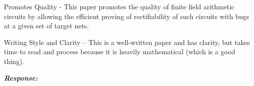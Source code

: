 Promotes Quality - This paper promotes the quality of finite field arithmetic circuits by allowing the efficient proving of rectifiability of such circuits with bugs at a given set of target nets.

Writing Style and Clarity -- This is a well-written paper and has clarity, but takes time to read and process because it is heavily mathematical (which is a good thing).

\par {\it{\bf Response:}}